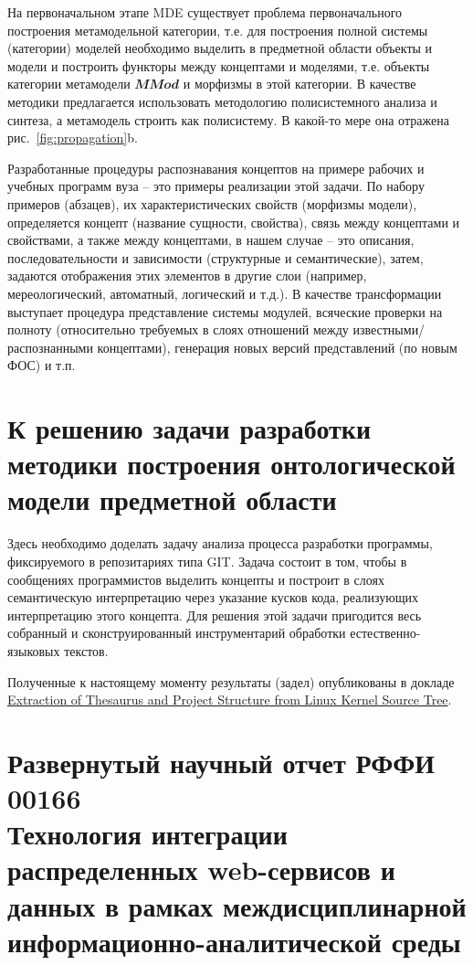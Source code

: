 \documentclass[12pt,a4paper]{ltxdoc}
\begin{document}
На первоначальном этапе MDE существует проблема первоначального построения метамодельной категории, т.е. для построения полной системы (категории) моделей необходимо выделить в предметной области объекты и модели и построить функторы между концептами и моделями, т.е. объекты категории метамодели $\mathbfit{MMod}$ и морфизмы в этой категории.  В качестве методики предлагается использовать методологию полисистемного анализа и синтеза, а метамодель строить как полисистему.  В какой-то мере она отражена рис.~\ref{fig:propagation}b.

Разработанные процедуры распознавания концептов на примере рабочих и учебных программ вуза -- это примеры реализации этой задачи.  По набору примеров (абзацев), их характеристических свойств (морфизмы модели), определяется концепт (название сущности, свойства), связь между концептами и свойствами, а также между концептами, в нашем случае -- это описания, последовательности и зависимости (структурные и семантические), затем, задаются отображения этих элементов в другие слои (например, мереологический, автоматный, логический и т.д.).  В качестве трансформации выступает процедура представление системы модулей, всяческие проверки на полноту (относительно требуемых в слоях отношений между известными/распознанными концептами), генерация новых версий представлений (по новым ФОС) и т.п.

\section{К решению задачи разработки методики построения онтологической модели предметной области}
\label{sec:technique-onto}

Здесь необходимо доделать задачу анализа процесса разработки программы, фиксируемого в репозитариях типа GIT\@.  Задача состоит в том, чтобы в сообщениях программистов выделить концепты и построит в слоях семантическую интерпретацию через указание кусков кода, реализующих интерпретацию этого концепта. Для решения этой задачи пригодится весь собранный и сконструированный инструментарий обработки естественно-языковых текстов.

Полученные к настоящему моменту результаты (задел) опубликованы в докладе \href{http://mipro-proceedings.com/sites/mipro-proceedings.com/files/upload/cis/cis_025.pdf}{Extraction of Thesaurus and Project Structure from Linux Kernel Source Tree}.

\section{Развернутый научный отчет РФФИ 00166\\Технология интеграции распределенных web-сервисов и данных в рамках междисциплинарной информационно-аналитической среды}
\label{sec:RFBRReport}
\end{document}

